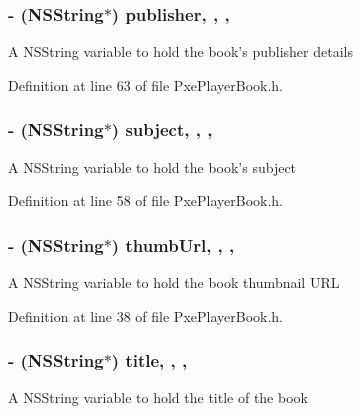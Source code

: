 \hypertarget{interface_pxe_player_book_a10d22f7a9625bb431db977410093dc7b}{
\subsubsection[{publisher}]{\setlength{\rightskip}{0pt plus 5cm}-\/ (N\-S\-String$\ast$) publisher\hspace{0.3cm}{\ttfamily [read]}, {\ttfamily [write]}, {\ttfamily [nonatomic]}, {\ttfamily [strong]}}}\label{interface_pxe_player_book_a10d22f7a9625bb431db977410093dc7b}
A N\-S\-String variable to hold the book's publisher details 

Definition at line 63 of file Pxe\-Player\-Book.\-h.

\hypertarget{interface_pxe_player_book_a96ae409bbcb6826fb23457e188b658fd}{
\subsubsection[{subject}]{\setlength{\rightskip}{0pt plus 5cm}-\/ (N\-S\-String$\ast$) subject\hspace{0.3cm}{\ttfamily [read]}, {\ttfamily [write]}, {\ttfamily [nonatomic]}, {\ttfamily [strong]}}}\label{interface_pxe_player_book_a96ae409bbcb6826fb23457e188b658fd}
A N\-S\-String variable to hold the book's subject 

Definition at line 58 of file Pxe\-Player\-Book.\-h.

\hypertarget{interface_pxe_player_book_a1396e4a5a219032f3482ab1556797790}{
\subsubsection[{thumb\-Url}]{\setlength{\rightskip}{0pt plus 5cm}-\/ (N\-S\-String$\ast$) thumb\-Url\hspace{0.3cm}{\ttfamily [read]}, {\ttfamily [write]}, {\ttfamily [nonatomic]}, {\ttfamily [strong]}}}\label{interface_pxe_player_book_a1396e4a5a219032f3482ab1556797790}
A N\-S\-String variable to hold the book thumbnail U\-R\-L 

Definition at line 38 of file Pxe\-Player\-Book.\-h.

\hypertarget{interface_pxe_player_book_a7b90d0569e28b2c8a548ce58fdd78089}{
\subsubsection[{title}]{\setlength{\rightskip}{0pt plus 5cm}-\/ (N\-S\-String$\ast$) title\hspace{0.3cm}{\ttfamily [read]}, {\ttfamily [write]}, {\ttfamily [nonatomic]}, {\ttfamily [strong]}}}\label{interface_pxe_player_book_a7b90d0569e28b2c8a548ce58fdd78089}
A N\-S\-String variable to hold the title of the book 


